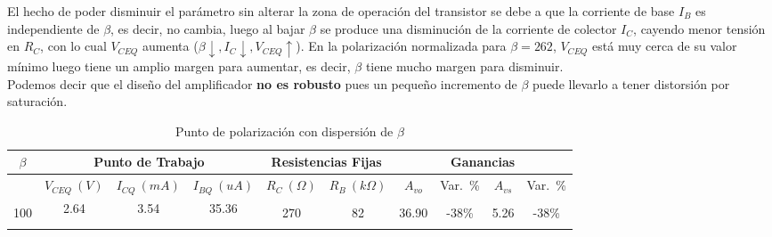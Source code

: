 \documentclass[a4paper, 10pt, spanish]{article}
\numberwithin{equation}{section}
\numberwithin{table}{section}
\begin{document}

El hecho de poder disminuir el parámetro sin alterar la zona de operación del transistor se debe a que la corriente de base $I_B$ es independiente de $\beta$, es decir, no cambia, luego al bajar $\beta$ se produce una disminución de la corriente de colector $I_C$, cayendo menor tensión en $R_C$, con lo cual $V_{CEQ}$ aumenta ($\beta \downarrow, I_C \downarrow, V_{CEQ} \uparrow$). En la polarización normalizada para $\beta = 262$, $V_{CEQ}$ está muy cerca de su valor mínimo luego tiene un amplio margen para aumentar, es decir, $\beta$ tiene mucho margen para disminuir.\\

Podemos decir que el diseño del amplificador \textbf{no es robusto} pues un pequeño incremento de $\beta$ puede llevarlo a tener distorsión por saturación. 
\vspace{3cm}
\begin{table}[ht!]
\begin{center}
\begin{tabular}{|c|c|c|c|c|c|c|c|c|c|}
    \hline
    $\beta$ &\multicolumn{3}{|c|}{Punto de Trabajo }                              & \multicolumn{2}{|c|}{Resistencias Fijas}    & \multicolumn{4}{|c|}{Ganancias}\\ \hline
            &$V_{CEQ}\ (V)$      & $I_{CQ}\ (mA)$        & $I_{BQ}\ (uA)$         & $R_C\ (\Omega)$ & $R_B\ (k\Omega)$          & $A_{vo}$ &Var.\ \% &  $A_{vs}$    &Var.\ \%    \\ \hline
            &\multirow{3}{*}{2.64}& \multirow{3}{*}{3.54} & \multirow{3}{*}{35.36} &                 &                          &          &        &         &           \\ 
        100 &                    &                       &                        & 270             &   82                      & 36.90    &   -38\%     &  5.26   &  -38\%     \\  
            &                    &                       &                        &                 &                           &          &        &         &           \\  \hline
\end{tabular}
\end{center}
\caption{Punto de polarización con dispersión de $\beta$}
\label{tab:multicol}
\end{table}
\end{document}
